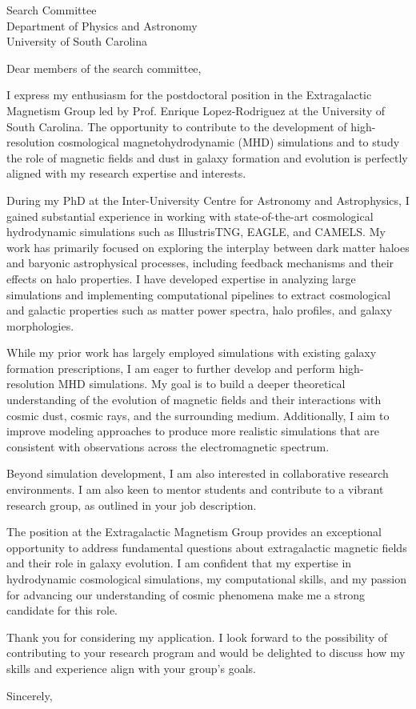 \documentclass[11pt]{letter}
\begin{document}
\begin{letter}{Search Committee \\ Department of Physics and Astronomy \\ University of South Carolina}

\opening{Dear members of the search committee,}



I express my enthusiasm for the postdoctoral position in the Extragalactic Magnetism Group led by Prof. Enrique Lopez-Rodriguez at the University of South Carolina. The opportunity to contribute to the development of high-resolution cosmological magnetohydrodynamic (MHD) simulations and to study the role of magnetic fields and dust in galaxy formation and evolution is perfectly aligned with my research expertise and interests.

During my PhD at the Inter-University Centre for Astronomy and Astrophysics, I gained substantial experience in working with state-of-the-art cosmological hydrodynamic simulations such as IllustrisTNG, EAGLE, and CAMELS. My work has primarily focused on exploring the interplay between dark matter haloes and baryonic astrophysical processes, including feedback mechanisms and their effects on halo properties. I have developed expertise in analyzing large simulations and implementing computational pipelines to extract cosmological and galactic properties such as matter power spectra, halo profiles, and galaxy morphologies. 

While my prior work has largely employed simulations with existing galaxy formation prescriptions, I am eager to further develop and perform high-resolution MHD simulations. My goal is to build a deeper theoretical understanding of the evolution of magnetic fields and their interactions with cosmic dust, cosmic rays, and the surrounding medium. Additionally, I aim to improve modeling approaches to produce more realistic simulations that are consistent with observations across the electromagnetic spectrum.

Beyond simulation development, I am also interested in collaborative research environments. I am also keen to mentor students and contribute to a vibrant research group, as outlined in your job description.

The position at the Extragalactic Magnetism Group provides an exceptional opportunity to address fundamental questions about extragalactic magnetic fields and their role in galaxy evolution. I am confident that my expertise in hydrodynamic cosmological simulations, my computational skills, and my passion for advancing our understanding of cosmic phenomena make me a strong candidate for this role.



Thank you for considering my application. I look forward to the possibility of contributing to your research program and would be delighted to discuss how my skills and experience align with your group's goals.

\closing{Sincerely,}

\end{letter}
\end{document}

